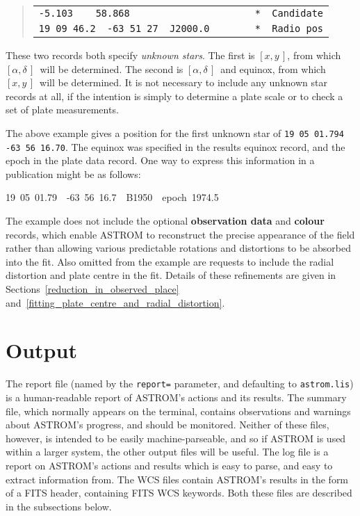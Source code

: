 \documentclass[twoside,11pt]{article}
\newcommand{\xlabel}[1]{}
\renewcommand{\_}{\texttt{\symbol{95}}}
\newcommand{\radec}     {$[\alpha,\delta\,]$}
\newcommand{\xy}        {$[x,y\,]$}
\begin{document}
\goodbreak
\begin{quote}
\begin{tabular}{|l|}
\hline
\verb|-5.103    58.868                      *  Candidate| \\
\verb|19 09 46.2  -63 51 27  J2000.0        *  Radio pos| \\
\hline
\end{tabular}
\end{quote}

These two records both specify \textit{unknown stars}.  The first is \xy,
from which \radec\ will be determined.  The second is \radec\ and equinox,
from which \xy\ will be determined.  It is not necessary to include any
unknown star records at all, if the intention is simply to determine a
plate scale or to check a set of plate measurements.

The above example gives a position for the first unknown star of
\texttt{19 05 01.794 -63 56 16.70}.  The equinox was specified in the
results equinox record, and the epoch in the plate data record.  One way
to express this information in a publication might be as follows:

\begin{center}
19~05~01.79~~-63~56~16.7~~B1950~~epoch~1974.5
\end{center}

The example does not include the optional \textbf{observation data}
and \textbf{colour} records, which enable ASTROM to reconstruct the
precise appearance of the field rather than allowing various predictable
rotations and distortions to be absorbed into the fit.  Also omitted from
the example are requests to include the radial distortion and plate centre
in the fit.  Details of these refinements are given in
Sections~\ref{reduction_in_observed_place}
and~\ref{fitting_plate_centre_and_radial_distortion}.

\section{\xlabel{output}Output}
\label{output}

The report file (named by the \texttt{report=} parameter, and defaulting to
\texttt{astrom.lis}) is a human-readable report of ASTROM's actions
and its results.  The summary file, which normally appears on the
terminal, contains observations and warnings about ASTROM's progress,
and should be monitored.  Neither of these files, however, is intended
to be easily machine-parseable, and so if ASTROM is used within a
larger system, the other output files will be useful.  The log file is
a report on ASTROM's actions and results which is easy to parse, and
easy to extract information from.  The WCS files contain ASTROM's
results in the form of a FITS header, containing FITS WCS keywords.
Both these files are described in the subsections below.
\end{document}

